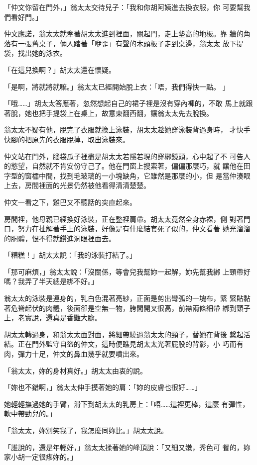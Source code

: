 「仲文你留在門外，」翁太太交待兒子：「我和你胡阿姨進去換衣服，你
可要幫我們看好門。」

仲文應諾，翁太太就牽著胡太太進到裡面，關起門，走上墊高的地板。靠
牆的角落有一張舊桌子，倆人踏著「咿歪」有聲的木頭板子走到桌邊，翁太太
放下提袋，找出她的泳衣。

「在這兒換啊？」胡太太還在懷疑。

「是啊，將就將就嘛。」翁太太已經開始脫上衣：「唔，我們得快一點。
」

「哦……」胡太太答應著，忽然想起自己的裙子裡是沒有穿內褲的，不敢
馬上就跟著脫，她也把手提袋上在桌上，故意東翻西翻，讓翁太太先去脫換。

翁太太不疑有他，脫完了衣服就換上泳裝，胡太太趁她穿泳裝背過身時，
才快手快腳的把原先的衣服脫掉，取出泳裝來。

仲文站在門外，腦袋瓜子裡盡是胡太太若隱若現的穿梆鏡頭，心中起了不
可告人的慾望，自然就不肯安份守己了。他在門窗上搜索著，偏偏那麼巧，就
讓他在田字型的窗櫺中間，找到毛玻璃的一小塊缺角，它雖然是那麼的小，但
是當仲湊眼上去，房間裡面的光景仍然被他看得清清楚楚。

仲文一看之下，雞巴又不聽話的突直起來。

房間裡，他母親已經換好泳裝，正在整裡肩帶。胡太太竟然全身赤裸，側
對著門口，努力在扯解著手上的泳裝，好像是有什麼結套死了似的，仲文看著
她光溜溜的胴體，恨不得就鑽進洞眼裡面去。

「糟糕！」胡太太說：「我的泳裝打結了。」

「那可麻煩，」翁太太說：「沒關係，等會兒我幫妳一起解，妳先幫我綁
上頸帶好嗎？我弄了半天總是綁不好。」

翁太太的泳裝是連身的，乳白色混著亮紗，正面是剪出彎弧的一塊布，緊
緊貼黏著危聳起伏的肉體，後面卻是空無一物，胯間開叉很高，前襟兩條細帶
綁到頸子上，老實說，還真是香豔大膽。

胡太太轉過身，和翁太太面對面，將細帶繞過翁太太的頸子，替她在背後
繫起活結。正在門外監守自盜的仲文，這時便瞧見胡太太光著屁股的背影，小
巧而有肉，彈力十足，仲文的鼻血幾乎就要噴出來。

「翁太太，妳的身材真好。」胡太太由衷的說。

「妳也不錯啊，」翁太太伸手摸著她的肩：「妳的皮膚也很好……」

她輕輕撫過她的手臂，滑下到胡太太的乳房上：「唔……這裡更棒，這麼
有彈性，軟中帶勁兒的。」

「翁太太，妳別笑我了，我怎麼同妳比。」胡太太說。

「誰說的，還是年輕好，」翁太太揉著她的峰頂說：「又細又嫩，秀色可
餐的，妳家小胡一定很疼妳的。」

